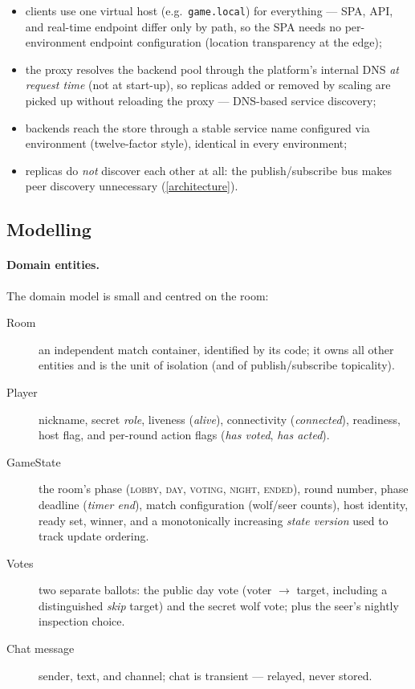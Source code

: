 \documentclass{scrartcl}
\begin{document}
\begin{itemize}
  \item clients use one virtual host (e.g.\ \texttt{game.local}) for
  everything --- SPA, API, and real-time endpoint differ only by path, so
  the SPA needs no per-environment endpoint configuration (location
  transparency at the edge);

  \item the proxy resolves the backend pool through the platform's
  internal DNS \emph{at request time} (not at start-up), so replicas
  added or removed by scaling are picked up without reloading the proxy
  --- DNS-based service discovery;

  \item backends reach the store through a stable service name
  configured via environment (twelve-factor style), identical in every
  environment;

  \item replicas do \emph{not} discover each other at all: the
  publish/subscribe bus makes peer discovery unnecessary
  (\cref{architecture}).
\end{itemize}

\subsection{Modelling}\label{modelling}

\paragraph{Domain entities.}
The domain model is small and centred on the room:

\begin{description}
  \item[Room] an independent match container, identified by its code; it
  owns all other entities and is the unit of isolation (and of
  publish/subscribe topicality).
  \item[Player] nickname, secret \emph{role}, liveness (\emph{alive}),
  connectivity (\emph{connected}), readiness, host flag, and per-round
  action flags (\emph{has voted}, \emph{has acted}).
  \item[GameState] the room's phase (\textsc{lobby}, \textsc{day},
  \textsc{voting}, \textsc{night}, \textsc{ended}), round number, phase
  deadline (\emph{timer end}), match configuration (wolf/seer counts),
  host identity, ready set, winner, and a monotonically increasing
  \emph{state version} used to track update ordering.
  \item[Votes] two separate ballots: the public day vote (voter
  $\rightarrow$ target, including a distinguished \emph{skip} target) and
  the secret wolf vote; plus the seer's nightly inspection choice.
  \item[Chat message] sender, text, and channel; chat is transient ---
  relayed, never stored.
\end{description}
\end{document}
